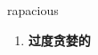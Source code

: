 
\begin{frame}
{\huge rapacious}
\begin{center}
\begin{enumerate}\Large
  \item \textbf{过度贪婪的}
\end{enumerate}
\end{center}
\end{frame}
